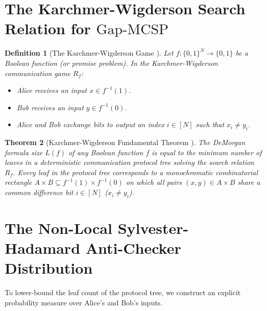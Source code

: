 \documentclass[11pt,letterpaper]{article}
\newtheorem{theorem}{Theorem}[section]
\newtheorem{definition}[theorem]{Definition}
\newcommand{\GapMCSP}{\mathrm{Gap\text{-}MCSP}}
\begin{document}
\section{The Karchmer-Wigderson Search Relation for $\GapMCSP$}

\begin{definition}[The Karchmer-Wigderson Game \cite{KW88}]
Let $f: \{0,1\}^N \to \{0,1\}$ be a Boolean function (or promise problem). In the Karchmer-Wigderson communication game $R_f$:
\begin{itemize}
    \item Alice receives an input $x \in f^{-1}(1)$.
    \item Bob receives an input $y \in f^{-1}(0)$.
    \item Alice and Bob exchange bits to output an index $i \in [N]$ such that $x_i \neq y_i$.
\end{itemize}
\end{definition}

\begin{theorem}[Karchmer-Wigderson Fundamental Theorem \cite{KW88}]
\label{thm:kw_leaf_bound}
The DeMorgan formula size $L(f)$ of any Boolean function $f$ is equal to the minimum number of leaves in a deterministic communication protocol tree solving the search relation $R_f$. Every leaf in the protocol tree corresponds to a monochromatic combinatorial rectangle $A \times B \subseteq f^{-1}(1) \times f^{-1}(0)$ on which all pairs $(x,y) \in A \times B$ share a common difference bit $i \in [N]$ ($x_i \neq y_i$).
\end{theorem}

\section{The Non-Local Sylvester-Hadamard Anti-Checker Distribution}

To lower-bound the leaf count of the protocol tree, we construct an explicit probability measure over Alice's and Bob's inputs.
\end{document}
